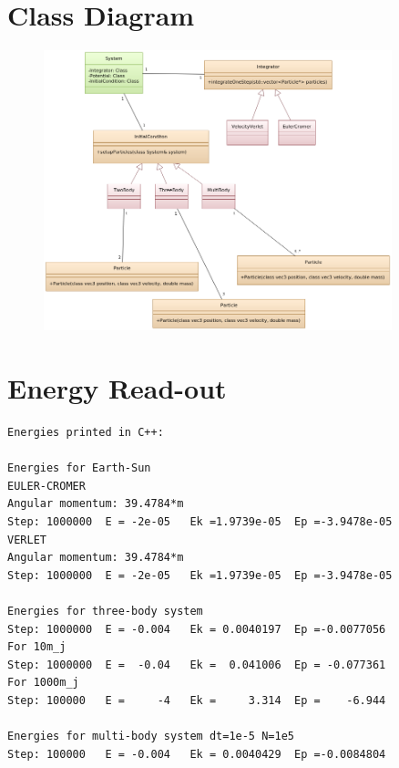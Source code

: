\documentclass[10pt,a4paper]{amsart}
\begin{document}
\vfill

\pagebreak

\begin{appendix}

\section{Class Diagram}
\label{app:classdiagram}

\begin{figure}[ht]
	\centering
	\includegraphics[width=0.9\textwidth]{../figures/classdiagram.png}
\end{figure}

\section{Energy Read-out}
\label{app:energy}
\begin{lstlisting}[keywordstyle=\ttfamily, identifierstyle=\ttfamily]
Energies printed in C++:

Energies for Earth-Sun
EULER-CROMER
Angular momentum: 39.4784*m
Step: 1000000  E = -2e-05   Ek =1.9739e-05  Ep =-3.9478e-05
VERLET
Angular momentum: 39.4784*m
Step: 1000000  E = -2e-05   Ek =1.9739e-05  Ep =-3.9478e-05

Energies for three-body system
Step: 1000000  E = -0.004   Ek = 0.0040197  Ep =-0.0077056
For 10m_j
Step: 1000000  E =  -0.04   Ek =  0.041006  Ep = -0.077361
For 1000m_j
Step: 100000   E =     -4   Ek =     3.314  Ep =    -6.944

Energies for multi-body system dt=1e-5 N=1e5
Step: 100000   E = -0.004   Ek = 0.0040429  Ep =-0.0084804
\end{lstlisting}

\end{appendix}
\end{document}
